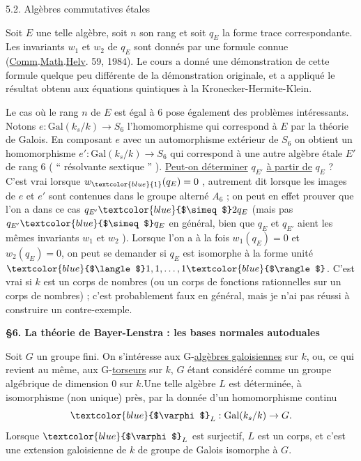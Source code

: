 \documentclass[11pt]{article}
\newcommand{\scanpage}[1]{\par\bigskip\noindent{\small\sffamily[scan #1]}\par}
\newcommand{\mspage}[1]{{\small\sffamily[p.\,#1]}}
\newcommand{\hand}[1]{\textcolor{blue}{#1}}
\newcommand{\uline}[1]{\underline{#1}}
\begin{document}
5.2. Algèbres commutatives étales

Soit $E$ une telle algèbre, soit $n$ son rang et soit $q_E$ la forme
trace correspondante. Les invariants $w_1$ et $w_2$ de $q_E$ sont donnés par
une formule connue (\uline{Comm}.\uline{Math}.\uline{Helv}. 59, 1984). Le cours a donné une
démonstration de cette formule quelque peu différente de la démonstration
originale, et a appliqué le résultat obtenu aux équations quintiques à la
Kronecker-Hermite-Klein.

\mspage{\hand{295}}

\clearpage
\scanpage{119/296}
\mspage{- 9 -}

Le cas où le rang $n$ de $E$ est égal à $6$ pose également des problèmes
intéressants. Notons $e : \mathrm{Gal}(k_s/k) \to S_6$ l'homomorphisme qui correspond à
$E$ par la théorie de Galois. En composant $e$ avec un automorphisme extérieur
de $S_6$ on obtient un homomorphisme $e' : \mathrm{Gal}(k_s/k) \to S_6$ qui correspond
à une autre algèbre étale $E'$ de rang $6$ ( `` résolvante sextique '' ).
\uline{Peut-on déterminer} $q_{E'}$ \uline{à partir de} $q_E$ ? C'est vrai lorsque $w_{\hand{1}}(q_E) = 0$ ,
autrement dit lorsque les images de $e$ et $e'$ sont contenues dans le
groupe alterné $A_6$ ; on peut en effet prouver que l'on a dans ce cas
$q_{E'} \hand{$\simeq$} 2q_E$ (mais pas $q_{E'} \hand{$\simeq$} q_E$ en général, bien que $q_E$ et $q_{E'}$ aient les
mêmes invariants $w_1$ et $w_2$ ). Lorsque l'on a à la fois $w_1(q_E) = 0$
et $w_2(q_E) = 0$, on peut se demander si $q_E$ est isomorphe à la forme
unité $\hand{$\langle$}1,1,\ldots,1\hand{$\rangle$}$. C'est vrai si $k$ est un corps de nombres (ou un corps
de fonctions rationnelles sur un corps de nombres) ; c'est probablement
faux en général, mais je n'ai pas réussi à construire un contre-exemple.

\textbf{§6. La théorie de Bayer-Lenstra : les bases normales autoduales}

Soit $G$ un groupe fini. On s'intéresse aux G-\uline{algèbres galoisiennes}
sur $k$, ou, ce qui revient au même, aux G-\uline{torseurs} sur $k$, $G$ étant considéré
comme un groupe algébrique de dimension $0$ sur $k$.Une telle algèbre $L$ est
déterminée, à isomorphisme (non unique) près, par la donnée d'un homomorphisme
continu
\[ \hand{$\varphi$}_L : \mathrm{Gal}(k_s/k) \to G. \]
Lorsque $\hand{$\varphi$}_L$ est surjectif, $L$ est un corps, et c'est une extension
galoisienne de $k$ de groupe de Galois isomorphe à $G$.
\end{document}
